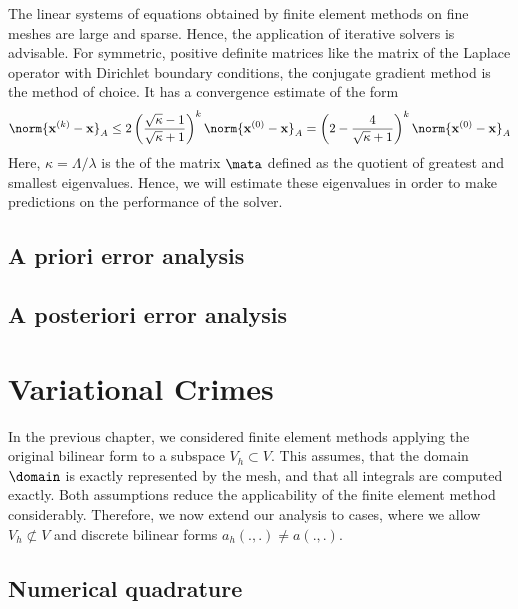 \begin{intro}
  The linear systems of equations obtained by finite element methods
  on fine meshes are large and sparse. Hence, the application of
  iterative solvers is advisable. For symmetric, positive definite
  matrices like the matrix of the Laplace operator with Dirichlet
  boundary conditions, the conjugate gradient method is the method of
  choice. It has a convergence estimate of the form
  \begin{gather}
    \label{eq:cg:1}
    \norm{\vecx^{(k)} - \vecx}_A \le 2
    \left(\frac{\sqrt\kappa-1}{\sqrt\kappa+1}\right)^k \norm{\vecx^{(0)} - \vecx}_A
    =
    \left(2-\frac{4}{\sqrt\kappa+1}\right)^k \norm{\vecx^{(0)} - \vecx}_A
  \end{gather}
  Here, $\kappa = \Lambda/\lambda$ is the  of the matrix $\mata$ defined as the quotient of greatest
  and smallest eigenvalues. Hence, we will estimate these eigenvalues
  in order to make predictions on the performance of the solver.
\end{intro}






\section{A priori error analysis}

\section{A posteriori error analysis}


\chapter{Variational Crimes}
\begin{intro}
  In the previous chapter, we considered finite element methods
  applying the original bilinear form to a subspace $V_h\subset
  V$. This assumes, that the domain $\domain$ is exactly represented
  by the mesh, and that all integrals are computed exactly. Both
  assumptions reduce the applicability of the finite element method
  considerably. Therefore, we now extend our analysis to cases, where
  we allow $V_h \not\subset V$ and discrete bilinear forms
  $a_h(.,.) \neq a(.,.)$.
\end{intro}

\section{Numerical quadrature}


